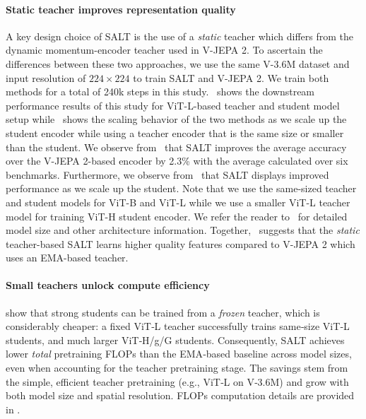 \documentclass{applemlr}
\numberwithin{equation}{section}
\newcommand{\ourmethod}{SALT\xspace}
\begin{document}
\paragraph{Static teacher improves representation quality} A key design choice of \ourmethod is the use of a \emph{static} teacher which differs from the dynamic momentum-encoder teacher used in V-JEPA 2. To ascertain the differences between these two approaches, we use the same V-3.6M dataset and input resolution of $224 \times 224$ to train \ourmethod and V-JEPA 2. We train both methods for a total of 240k steps in this study.~ shows the downstream performance results of this study for ViT-L-based teacher and student model setup while~ shows the scaling behavior of the two methods as we scale up the student encoder while using a teacher encoder that is the same size or smaller than the student. We observe from~ that \ourmethod improves the average accuracy over the V-JEPA 2-based encoder by 2.3\% with the average calculated over six benchmarks. Furthermore, we observe from~ that \ourmethod displays improved performance as we scale up the student. Note that we use the same-sized teacher and student models for ViT-B and ViT-L while we use a smaller ViT-L teacher model for training ViT-H student encoder. We refer the reader to~ for detailed model size and other architecture information. Together,~ suggests that the \emph{static} teacher-based \ourmethod learns higher quality features compared to V-JEPA 2 which uses an EMA-based teacher.

\paragraph{Small teachers unlock compute efficiency}
 show that strong students can be trained from a \emph{frozen} teacher, which is considerably cheaper: a fixed ViT‑L teacher successfully trains same‑size ViT‑L students, and much larger ViT‑H/g/G students. Consequently, \ourmethod achieves lower \emph{total} pretraining FLOPs than the EMA‑based baseline across model sizes, even when accounting for the teacher pretraining stage. 
The savings stem from the simple, efficient teacher pretraining (e.g., ViT‑L on V‑3.6M) and grow with both model size and spatial resolution. FLOPs computation details are provided in .
\end{document}
